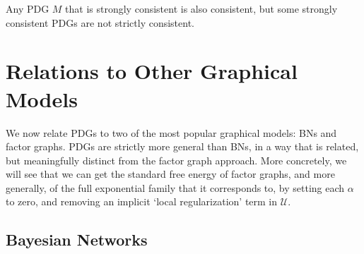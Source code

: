 \documentclass{article}
\numberwithin{equation}{section}
\begin{document}
{\begin{vfull}
	\begin{prop}
		Any PDG $M$ that is strongly consistent is also consistent, but some strongly consistent PDGs are not strictly consistent.
	\end{prop}




	\end{vfull}
	
}


	\section{Relations to Other Graphical Models}\label{sec:other-graphical-models}
	We now relate PDGs to two of the most popular graphical models: BNs and factor graphs. PDGs are strictly more general than BNs, in a way that is related, but meaningfully distinct from the factor graph approach. More concretely, we will see that we can get the standard free energy of factor graphs, and more generally, of the full exponential family that it corresponds to, by setting each $\alpha$ to zero, and removing an implicit  `local regularization' term in $\mathcal U$.
		
	\subsection{Bayesian Networks} \label{sec:bn-convert}
		
\end{document}
